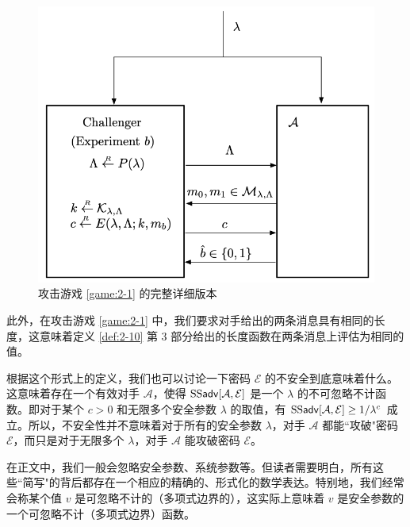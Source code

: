 \begin{figure}
  \centering
  \includegraphics[width=0.5\linewidth]{figures/chapter2/fig6.png}
  \caption{攻击游戏 \ref{game:2-1} 的完整详细版本}
  \label{fig:2-6}
\end{figure}

此外，在攻击游戏 \ref{game:2-1} 中，我们要求对手给出的两条消息具有相同的长度，这意味着定义 \ref{def:2-10} 第 3 部分给出的长度函数在两条消息上评估为相同的值。

根据这个形式上的定义，我们也可以讨论一下密码 $\mathcal{E}$ 的不安全到底意味着什么。这意味着存在一个有效对手 $\mathcal{A}$，使得 ${\rm SS\mathsf{adv}}[\mathcal{A},\mathcal{E}]$ 是一个 $\lambda$ 的不可忽略不计函数。即对于某个 $c>0$ 和无限多个安全参数 $\lambda$ 的取值，有 ${\rm SS\mathsf{adv}}[\mathcal{A},\mathcal{E}]\geq{1}/{\lambda^c}$ 成立。所以，不安全性并不意味着对于所有的安全参数 $\lambda$，对手 $\mathcal{A}$ 都能``攻破"密码 $\mathcal{E}$，而只是对于无限多个 $\lambda$，对手 $\mathcal{A}$ 能攻破密码 $\mathcal{E}$。

在正文中，我们一般会忽略安全参数、系统参数等。但读者需要明白，所有这些``简写"的背后都存在一个相应的精确的、形式化的数学表达。特别地，我们经常会称某个值 $v$ 是可忽略不计的（多项式边界的），这实际上意味着 $v$ 是安全参数的一个可忽略不计（多项式边界）函数。